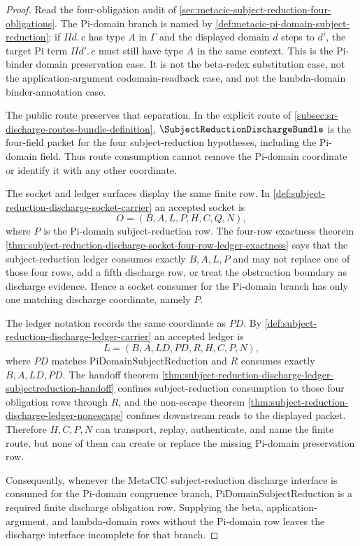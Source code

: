 \begin{proof}
Read the four-obligation audit of \autoref{sec:metacic-subject-reduction-four-obligations}. The Pi-domain branch is named by \autoref{def:metacic-pi-domain-subject-reduction}: if $\Pi d.\,c$ has type $A$ in $\Gamma$ and the displayed domain $d$ steps to $d'$, the target Pi term $\Pi d'.\,c$ must still have type $A$ in the same context. This is the Pi-binder domain preservation case. It is not the beta-redex substitution case, not the application-argument codomain-readback case, and not the lambda-domain binder-annotation case.

The public route preserves that separation. In the explicit route of \autoref{subsec:sr-discharge-routes-bundle-definition}, $\SubjectReductionDischargeBundle$ is the four-field packet for the four subject-reduction hypotheses, including the Pi-domain field. Thus route consumption cannot remove the Pi-domain coordinate or identify it with any other coordinate.

The socket and ledger surfaces display the same finite row. In \autoref{def:subject-reduction-discharge-socket-carrier} an accepted socket is
$$
O=(B,A,L,P,H,C,Q,N),
$$
where $P$ is the Pi-domain subject-reduction row. The four-row exactness theorem \autoref{thm:subject-reduction-discharge-socket-four-row-ledger-exactness} says that the subject-reduction ledger consumes exactly $B,A,L,P$ and may not replace one of those four rows, add a fifth discharge row, or treat the obstruction boundary as discharge evidence. Hence a socket consumer for the Pi-domain branch has only one matching discharge coordinate, namely $P$.

The ledger notation records the same coordinate as $PD$. By \autoref{def:subject-reduction-discharge-ledger-carrier} an accepted ledger is
$$
L=(B,A,LD,PD,R,H,C,P,N),
$$
where $PD$ matches $\mathrm{PiDomainSubjectReduction}$ and $R$ consumes exactly $B,A,LD,PD$. The handoff theorem \autoref{thm:subject-reduction-discharge-ledger-subjectreduction-handoff} confines subject-reduction consumption to those four obligation rows through $R$, and the non-escape theorem \autoref{thm:subject-reduction-discharge-ledger-nonescape} confines downstream reads to the displayed packet. Therefore $H,C,P,N$ can transport, replay, authenticate, and name the finite route, but none of them can create or replace the missing Pi-domain preservation row.

Consequently, whenever the MetaCIC subject-reduction discharge interface is consumed for the Pi-domain congruence branch, $\mathrm{PiDomainSubjectReduction}$ is a required finite discharge obligation row. Supplying the beta, application-argument, and lambda-domain rows without the Pi-domain row leaves the discharge interface incomplete for that branch.
\end{proof}

